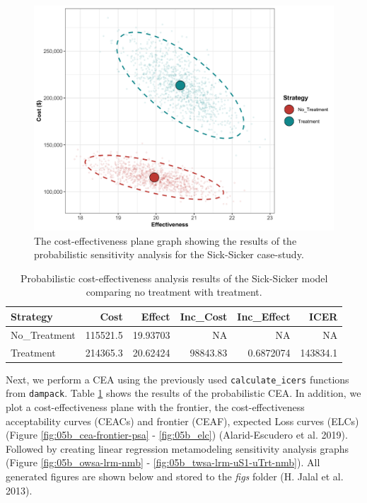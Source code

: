 \documentclass[]{article}
\begin{document}
\begin{figure}
\centering
\includegraphics{../figs/05b_cea-plane-scatter.png}
\caption{The cost-effectiveness plane graph showing the results of the
probabilistic sensitivity analysis for the Sick-Sicker case-study.
\label{fig:05b_CEAplane}}
\end{figure}

\begin{table}[t]

\caption{\label{tab:unnamed-chunk-21}Probabilistic cost-effectiveness analysis results of the Sick-Sicker model comparing no treatment with treatment. \label{tab:df.cea.prob}}
\centering
\begin{tabular}{l|r|r|r|r|r}
\hline
Strategy & Cost & Effect & Inc\_Cost & Inc\_Effect & ICER\\
\hline
No\_Treatment & 115521.5 & 19.93703 & NA & NA & NA\\
\hline
Treatment & 214365.3 & 20.62424 & 98843.83 & 0.6872074 & 143834.1\\
\hline
\end{tabular}
\end{table}

Next, we perform a CEA using the previously used
\texttt{calculate\_icers} functions from \texttt{dampack}. Table
\ref{tab:df.cea.prob} shows the results of the probabilistic CEA. In
addition, we plot a cost-effectiveness plane with the frontier, the
cost-effectiveness acceptability curves (CEACs) and frontier (CEAF),
expected Loss curves (ELCs) (Figure \ref{fig:05b_cea-frontier-psa} -
\ref{fig:05b_elc}) (Alarid-Escudero et al. 2019). Followed by creating
linear regression metamodeling sensitivity analysis graphs (Figure
\ref{fig:05b_owsa-lrm-nmb} - \ref{fig:05b_twsa-lrm-uS1-uTrt-nmb}). All
generated figures are shown below and stored to the \emph{figs} folder
(H. Jalal et al. 2013).
\end{document}

